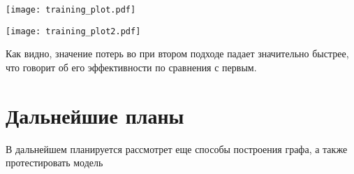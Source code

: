 \documentclass[12pt, twoside]{article}
\begin{document}
\begin{center}
\texttt{[image: training\_plot.pdf]}
\end{center}

\begin{center}
\texttt{[image: training\_plot2.pdf]}
\end{center}

Как видно, значение потерь во при втором подходе падает значительно быстрее, что говорит об его эффективности по сравнения с первым.

\section{Дальнейшие планы}
В дальнейшем планируется рассмотрет еще способы построения графа, а также протестировать модель

\newpage



\end{document}

